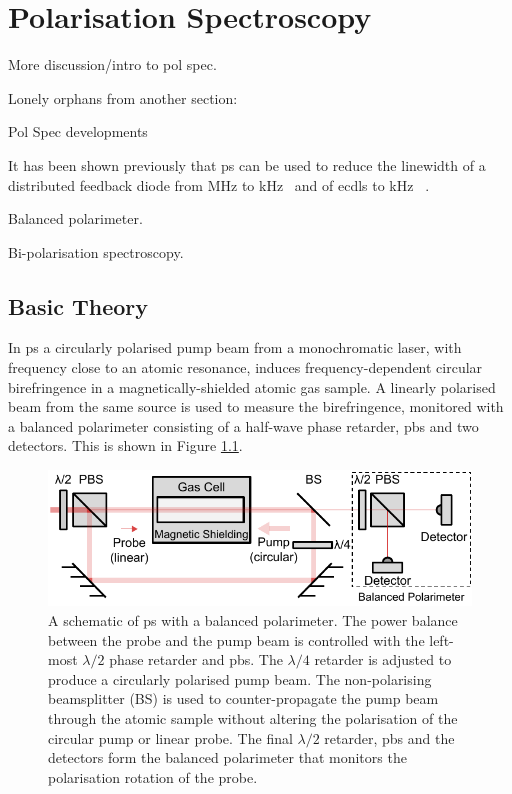 \chapter{Polarisation Spectroscopy}\label{chapter:pol_spec}

{\color{red}More discussion/intro to pol spec.

Lonely orphans from another section:

Pol Spec developments

It has been shown previously that \gls*{ps} can be used to reduce the linewidth of a distributed feedback diode from \unit[2]{MHz} to \unit[20]{kHz}~\cite{torii_laser-phase_2012} and of \glspl*{ecdl} to \unit[65]{kHz}
~\cite{yoshikawa_frequency_2003}.

Balanced polarimeter.\cite{pearman_polarization_2002,yoshikawa_frequency_2003}

Bi-polarisation spectroscopy.\cite{tiwari_laser_2006}

}

\section{Basic Theory}\label{section:pol_spec_theory}

In \gls{ps} a circularly polarised pump beam from a monochromatic laser, with frequency close to an atomic resonance, induces frequency-dependent circular birefringence in a magnetically-shielded atomic gas sample.
A linearly polarised beam from the same source is used to measure the birefringence, monitored with a balanced polarimeter consisting of a half-wave phase retarder, \gls{pbs} and two detectors.
This is shown in Figure \ref{figure:pol_spec_schematic}.

\begin{figure}
\centering
\includegraphics[width=\linewidth]{part1/Figs/PolSpecSchematic.pdf}
\caption{A schematic of \gls{ps} with a balanced polarimeter.
The power balance between the probe and the pump beam is controlled with the left-most $\lambda/2$ phase retarder and \gls{pbs}.
The $\lambda/4$ retarder is adjusted to produce a circularly polarised pump beam.
The non-polarising beamsplitter (BS) is used to counter-propagate the pump beam through the atomic sample without altering the polarisation of the circular pump or linear probe.
The final $\lambda/2$ retarder, \gls{pbs} and the detectors form the balanced polarimeter that monitors the polarisation rotation of the probe.}
\label{figure:pol_spec_schematic}
\end{figure}

